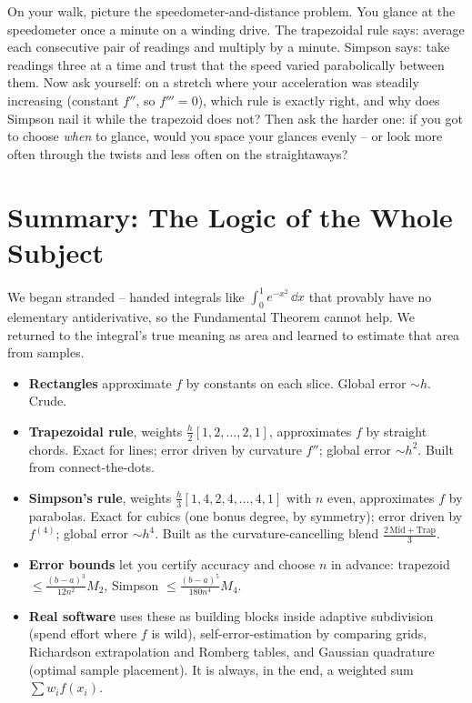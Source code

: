 \begin{walkbox}
On your walk, picture the speedometer-and-distance problem. You glance at the speedometer once a minute on a winding drive. The trapezoidal rule says: average each consecutive pair of readings and multiply by a minute. Simpson says: take readings three at a time and trust that the speed varied parabolically between them. Now ask yourself: on a stretch where your acceleration was steadily increasing (constant $f''$, so $f''' = 0$), which rule is exactly right, and why does Simpson nail it while the trapezoid does not? Then ask the harder one: if you got to choose \emph{when} to glance, would you space your glances evenly -- or look more often through the twists and less often on the straightaways?
\end{walkbox}

\section{Summary: The Logic of the Whole Subject}
\label{ch27:summary}

We began stranded -- handed integrals like $\int_0^1 e^{-x^2}\,\dd x$ that provably have no elementary antiderivative, so the Fundamental Theorem cannot help. We returned to the integral's true meaning as area and learned to estimate that area from samples.

\begin{itemize}
\item \textbf{Rectangles} approximate $f$ by constants on each slice. Global error $\sim h$. Crude.
\item \textbf{Trapezoidal rule}, weights $\tfrac{h}{2}[1,2,\dots,2,1]$, approximates $f$ by straight chords. Exact for lines; error driven by curvature $f''$; global error $\sim h^2$. Built from connect-the-dots.
\item \textbf{Simpson's rule}, weights $\tfrac{h}{3}[1,4,2,4,\dots,4,1]$ with $n$ even, approximates $f$ by parabolas. Exact for cubics (one bonus degree, by symmetry); error driven by $f^{(4)}$; global error $\sim h^4$. Built as the curvature-cancelling blend $\tfrac{2\,\text{Mid} + \text{Trap}}{3}$.
\item \textbf{Error bounds} let you certify accuracy and choose $n$ in advance: trapezoid $\le \tfrac{(b-a)^3}{12n^2}M_2$, Simpson $\le \tfrac{(b-a)^5}{180n^4}M_4$.
\item \textbf{Real software} uses these as building blocks inside adaptive subdivision (spend effort where $f$ is wild), self-error-estimation by comparing grids, Richardson extrapolation and Romberg tables, and Gaussian quadrature (optimal sample placement). It is always, in the end, a weighted sum $\sum w_i f(x_i)$.
\end{itemize}

